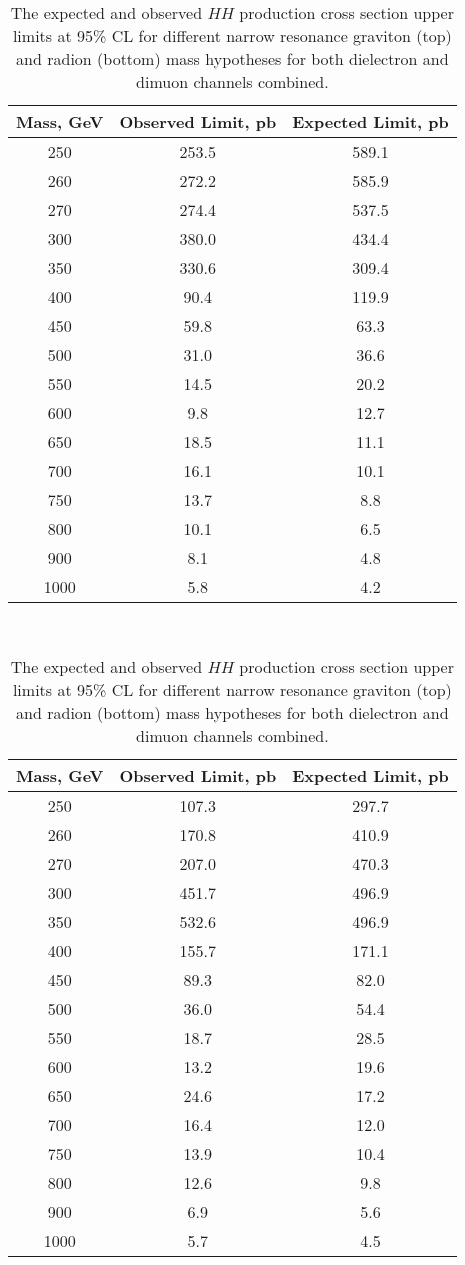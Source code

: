 \begin{table}[H]
\begin{center}
\caption{The expected and observed $HH$ production cross section upper limits at 95\% CL for different
narrow resonance graviton (top) and radion (bottom) mass hypotheses for both dielectron and dimuon channels combined.}
\label{tab:finalLimits}
\begin{tabular}{|c|c|c|}
\hline
Mass, GeV & Observed Limit, pb & Expected Limit, pb \\
\hline
250 & 253.5 & 589.1 \\
260 & 272.2 & 585.9 \\
270 & 274.4 & 537.5 \\
300 & 380.0 & 434.4 \\
350 & 330.6 & 309.4 \\
400 & 90.4 & 119.9 \\
450 & 59.8 & 63.3 \\
500 & 31.0 & 36.6 \\
550 & 14.5 & 20.2 \\
600 & 9.8 & 12.7 \\
650 & 18.5 & 11.1 \\
700 & 16.1 & 10.1 \\
750 & 13.7 & 8.8 \\
800 & 10.1 & 6.5 \\
900 & 8.1 & 4.8 \\
1000 & 5.8 & 4.2 \\
\hline
\end{tabular}
\vspace{1 cm} \ \\
\begin{tabular}{|c|c|c|}
\hline
Mass, GeV & Observed Limit, pb & Expected Limit, pb \\
\hline
250 & 107.3 & 297.7 \\
260 & 170.8 & 410.9 \\
270 & 207.0 & 470.3 \\
300 & 451.7 & 496.9 \\
350 & 532.6 & 496.9 \\
400 & 155.7 & 171.1 \\
450 & 89.3 & 82.0 \\
500 & 36.0 & 54.4 \\
550 & 18.7 & 28.5 \\
600 & 13.2 & 19.6 \\
650 & 24.6 & 17.2 \\
700 & 16.4 & 12.0 \\
750 & 13.9 & 10.4 \\
800 & 12.6 & 9.8 \\
900 & 6.9 & 5.6 \\
1000 & 5.7 & 4.5 \\
\hline
\end{tabular}
\end{center}
\end{table}

